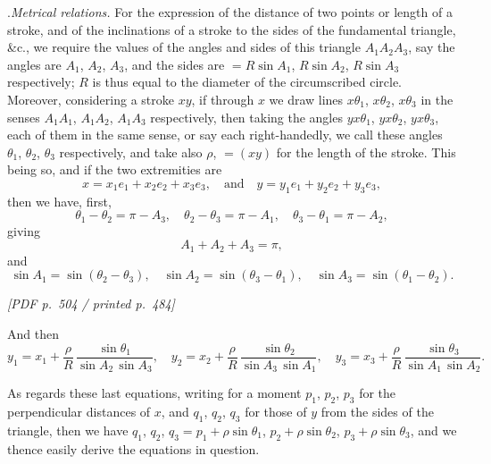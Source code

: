 \documentclass[11pt]{article}
\begin{document}
.\quad \textit{Metrical relations.} For the expression of the distance of two points or length of a stroke, and of the inclinations of a stroke to the sides of the fundamental triangle, \&c., we require the values of the angles and sides of this triangle $A_{1}A_{2}A_{3}$, say the angles are $A_{1}$, $A_{2}$, $A_{3}$, and the sides are $= R\sin A_{1}$, $R\sin A_{2}$, $R\sin A_{3}$ respectively; $R$ is thus equal to the diameter of the circumscribed circle. Moreover, considering a stroke $xy$, if through $x$ we draw lines $x\theta_{1}$, $x\theta_{2}$, $x\theta_{3}$ in the senses $A_{1}A_{1}$, $A_{1}A_{2}$, $A_{1}A_{3}$ respectively, then taking the angles $yx\theta_{1}$, $yx\theta_{2}$, $yx\theta_{3}$, each of them in the same sense, or say each right-handedly, we call these angles $\theta_{1}$, $\theta_{2}$, $\theta_{3}$ respectively, and take also $\rho$, $= (xy)$ for the length of the stroke. This being so, and if the two extremities are
\[
x = x_{1}e_{1} + x_{2}e_{2} + x_{3}e_{3},\quad \text{and}\quad y = y_{1}e_{1} + y_{2}e_{2} + y_{3}e_{3},
\]
then we have, first,
\[
\theta_{1} - \theta_{2} = \pi - A_{3},\quad \theta_{2} - \theta_{3} = \pi - A_{1},\quad \theta_{3} - \theta_{1} = \pi - A_{2},
\]
giving
\[
A_{1} + A_{2} + A_{3} = \pi,
\]
and
\[
\sin A_{1} = \sin(\theta_{2} - \theta_{3}),\quad \sin A_{2} = \sin(\theta_{3} - \theta_{1}),\quad \sin A_{3} = \sin(\theta_{1} - \theta_{2}).
\]

\vfill
\noindent\textit{[PDF p.~504 / printed p.~484]}
\newpage

\noindent And then
\[
y_{1} = x_{1} + \frac{\rho}{R}\,\frac{\sin\theta_{1}}{\sin A_{2}\,\sin A_{3}},\quad y_{2} = x_{2} + \frac{\rho}{R}\,\frac{\sin\theta_{2}}{\sin A_{3}\,\sin A_{1}},\quad y_{3} = x_{3} + \frac{\rho}{R}\,\frac{\sin\theta_{3}}{\sin A_{1}\,\sin A_{2}}.
\]

As regards these last equations, writing for a moment $p_{1}$, $p_{2}$, $p_{3}$ for the perpendicular distances of $x$, and $q_{1}$, $q_{2}$, $q_{3}$ for those of $y$ from the sides of the triangle, then we have $q_{1}$, $q_{2}$, $q_{3} = p_{1} + \rho\sin\theta_{1}$, $p_{2} + \rho\sin\theta_{2}$, $p_{3} + \rho\sin\theta_{3}$, and we thence easily derive the equations in question.

\medskip
\end{document}
